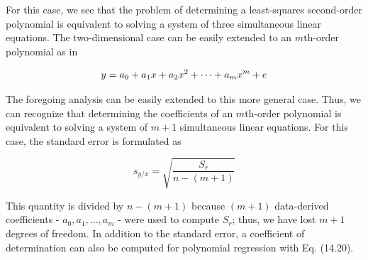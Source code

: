 \documentclass[../main.tex]{subfiles}
\begin{document}
For this case, we see that the problem of determining a least-squares second-order polynomial is equivalent to solving a system of three simultaneous linear equations. The two-dimensional case can be easily extended to an $m$th-order polynomial as in

\begin{equation}
	\notag
	y = a_0 + a_1 x + a_2 x^2 + \cdots + a_m x^m + e
\end{equation}

The foregoing analysis can be easily extended to this more general case. Thus, we can recognize that determining the coefficients of an $m$th-order polynomial is equivalent to solving a system of $m + 1$ simultaneous linear equations. For this case, the standard error is formulated as

\begin{equation}
	\tag{15.3}
	s_{y/x} = \sqrt{\frac{S_r}{n - (m + 1)}}
\end{equation}

This quantity is divided by $n - (m + 1)$ because $(m + 1)$ data-derived coefficients - $a_0, a_1, ..., a_m$ - were used to compute $S_r$; thus, we have lost $m + 1$ degrees of freedom. In addition to the standard error, a coefficient of determination can also be computed for polynomial regression with Eq. (14.20).
\end{document}
